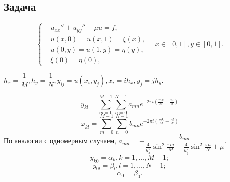 \subsection*{Задача}

\[ \left\lbrace \begin{aligned}
    & u_{xx}'' + u_{yy}'' - \mu u = f, \\
    & u(x, 0) = u(x, 1) = \xi(x), \\
    & u(0, y) = u(1, y) = \eta(y), \\
    & \xi(0) = \eta(0),
\end{aligned} \quad x \in [0, 1], y \in [0, 1]. \right. \]

\( h_x = \dfrac{1}{M}, h_y = \dfrac{1}{N}, y_{ij} = u(x_i, y_j), x_i = i h_x, y_j = j h_y. \)

\[ y_{kl} = \sum \limits_{m = 0}^{M - 1} \sum \limits_{n = 0}^{N - 1} a_{mn} e^{-2 \pi i \left( \frac{mk}{M} + \frac{nl}{N} \right)} \]
\[ \varphi_{kl} = \sum \limits_{m = 0}^{M - 1} \sum \limits_{n = 0}^{N - 1} b_{mn} e^{-2\pi i \left( \frac{mk}{M} + \frac{nl}{N} \right)} \]
По аналогии с одномерным случаем, \( a_{mn} = -\dfrac{b_{mn}}{\frac{4}{h_x^2} \sin^2 \frac{\pi m}{M} + \frac{4}{h_y^2} \sin^2 \frac{\pi n}{N} + \mu}. \)
\[ y_{k0} = \alpha_k, k = 1, \ldots, M - 1; \]
\[ y_{0l} = \beta_l, l = 1, \ldots, N - 1; \]
\[ \alpha_0 = \beta_0. \]